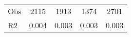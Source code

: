 \begin{tabular}{l*{4}{c}}
\hline                                                                                                                                                                                                                                            
 Obs                   &               2115               &       1913                       &       1374                &              2701                                               \\ 
 R2                    &                      0.004              &              0.003                      &              0.003               &                     0.003                                              \\ 
\hline \end{tabular}                                                                                                                                                                                                              